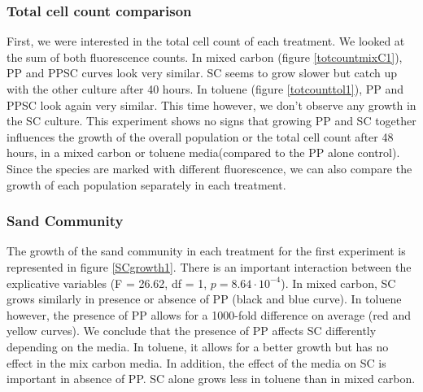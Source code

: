 \documentclass[a4paper, 10pt, conference]{ieeeconf}   %
\begin{document}
\subsubsection{Total cell count comparison}


First, we were interested in the total cell count of each treatment. We looked at the sum of both fluorescence counts.
In mixed carbon (figure \ref{totcountmixC1}), PP and PPSC curves look very similar. SC seems to grow slower but catch up with the other culture after 40 hours.
In toluene (figure \ref{totcounttol1}), PP and PPSC look again very similar. This time however, 
we don’t observe any growth in the SC culture.
This experiment shows no signs that growing PP and SC together influences the growth of the overall population or the total cell count after 48 hours, in a mixed carbon or toluene media(compared to the PP alone control).
Since the species are marked with different fluorescence, we can also compare the growth of each population separately in each treatment.\newline

\subsubsection{Sand Community}
The growth of the sand community in each treatment for the first experiment is represented in figure \ref{SCgrowth1}.
There is an important interaction between the explicative variables (F = 26.62, df = 1, $p = 8.64\cdot 10 ^{-4}$).
In mixed carbon, SC grows similarly in presence or absence of PP (black and blue curve).
In toluene however, the presence of PP allows for a 1000-fold difference on average (red and yellow curves).
We conclude that the presence of PP affects SC differently depending on the media. In toluene, it allows for a better growth but has no effect in the mix carbon media. In addition, the effect of the media on SC is important in absence of PP. SC alone grows less in toluene than in mixed carbon.\newline
\end{document}
